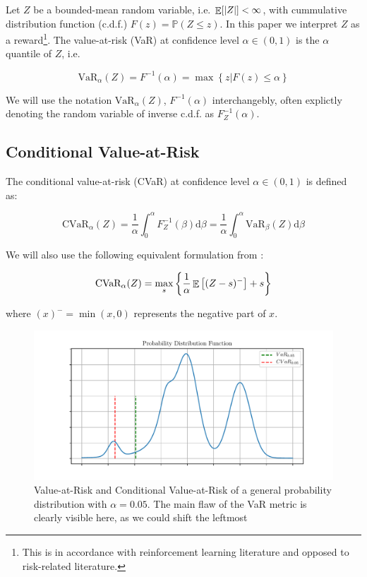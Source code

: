 Let $Z$ be a bounded-mean random variable, i.e. $\mathop{\mathbb{E}}[|Z|] < \infty$, with cummulative distribution function (c.d.f.) $F(z) = \mathbb{P}(Z \le z)$.
In this paper we interpret $Z$ as a reward\footnote{This is in accordance with reinforcement learning literature and opposed to risk-related literature.}. The value-at-risk (VaR) at confidence level $\alpha \in (0,1)$ is the $\alpha$ quantile of $Z$, i.e. 

\begin{equation}
\text{VaR}_\alpha(Z)=F^{-1}(\alpha)=\max\left\lbrace z | F(z) \le \alpha \right\rbrace
\end{equation}

We will use the notation $\text{VaR}_\alpha(Z)$, $F^{-1}(\alpha)$ interchangebly, often explictly denoting the random variable of inverse c.d.f. as $F^{-1}_Z(\alpha)$.

\subsection{Conditional Value-at-Risk}
The conditional value-at-risk (CVaR) at confidence level $\alpha \in (0,1)$ is defined as:

\begin{equation}
\text{CVaR}_\alpha(Z) = \dfrac{1}{\alpha}\int_0^\alpha F^{-1}_Z(\beta) \text{d}\beta = \dfrac{1}{\alpha}\int_0^\alpha \text{VaR}_\beta(Z) \text{d}\beta
\end{equation}

We will also use the following equivalent formulation from \cite{rockafellar2000optimization}:

\begin{equation}\label{eq:cvardef}
\text{CVaR}_\alpha(Z)=
\max_s\left\lbrace \dfrac{1}{\alpha}\mathop{\mathbb{E}}
\left[ (Z-s)^-\right] + s  \right\rbrace 
\end{equation}

where $(x)^- = \min(x, 0)$ represents the negative part of $x$.

\begin{figure}
\center
\includegraphics[width=\linewidth]{gfx/pdf.pdf}
\caption{Value-at-Risk and Conditional Value-at-Risk of a general probability distribution with $\alpha=0.05$. The main flaw of the VaR metric is clearly visible here, as we could shift the leftmost }
\end{figure}




